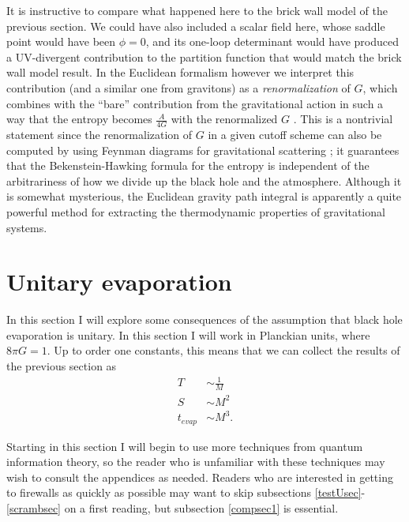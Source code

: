 \documentclass[12pt]{article}
\begin{document}
It is instructive to compare what happened here to the brick wall model of the previous section.  We could have also included a scalar field here, whose saddle point would have been $\phi=0$, and its one-loop determinant would have produced a UV-divergent contribution to the partition function that would match the brick wall model result.  In the Euclidean formalism however we interpret this contribution (and a similar one from gravitons) as a \textit{renormalization} of $G$, which combines with the ``bare'' contribution from the gravitational action in such a way that the entropy becomes $\frac{A}{4G}$ with the renormalized $G$ \cite{Susskind:1994sm,Demers:1995dq}.  This is a nontrivial statement since the renormalization of $G$ in a given cutoff scheme can also be computed by using Feynman diagrams for gravitational scattering \cite{Demers:1995dq}; it guarantees that the Bekenstein-Hawking formula for the entropy is independent of the arbitrariness of how we divide up the black hole and the atmosphere.  Although it is somewhat mysterious, the Euclidean gravity path integral is apparently a quite powerful method for extracting the thermodynamic properties of gravitational systems.  

\section{Unitary evaporation}\label{evapsec}
In this section I will explore some consequences of the assumption that black hole evaporation is unitary.  In this section I will work in Planckian units, where $8\pi G=1$.  Up to order one constants, this means that we can collect the results of the previous section as
\begin{align}
T&\sim\frac{1}{M}\\
S&\sim M^2\\
t_{\mathit{evap}}&\sim M^3.
\end{align}

Starting in this section I will begin to use more techniques from quantum information theory, so the reader who is unfamiliar with these techniques may wish to consult the appendices as needed.  Readers who are interested in getting to firewalls as quickly as possible may want to skip subsections \ref{testUsec}-\ref{scrambsec} on a first reading, but subsection \ref{compsec1} is essential.
\end{document}
